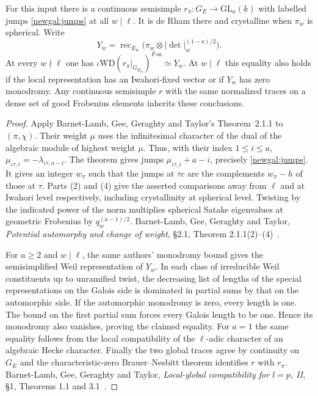 \begin{proposition}
For this input\label{newgal:classical} there is a continuous semisimple $r_\pi:G_E\to
\mathrm{GL}_a(k)$ with labelled jumps \eqref{newgal:jumps} at all
$w\mid\ell$. It is de Rham there and crystalline when $\pi_w$ is
spherical. Write
\[
 Y_w=\operatorname{rec}_{E_w}\bigl(\pi_w\otimes|\det|_w^{(1-a)/2}\bigr).
\]
At every $w\nmid\ell$ one has $\iota\mathrm{WD}(r_\pi|_{G_{E_w}})^{F\text{-}\mathrm{ss}}
\simeq Y_w$. At $w\mid\ell$ this equality also holds if the local
representation has an Iwahori-fixed vector or if $Y_w$ has zero monodromy.
Any continuous semisimple $r$ with the same normalized traces on a dense
set of good Frobenius elements inherits these conclusions.
\end{proposition}
\begin{proof}
Apply Barnet-Lamb, Gee, Geraghty and Taylor's Theorem~2.1.1 to $(\pi,\chi)$.
Their weight $\mu$ uses the infinitesimal character of the dual of the
algebraic module of highest weight $\mu$. Thus, with their index $1\le i\le a$,
$\mu_{\iota\tau,i}=-\lambda_{\iota\tau,a-i}$. The theorem gives jumps
$\mu_{\iota\tau,i}+a-i$, precisely \eqref{newgal:jumps}. It gives an
integer $w_\pi$ such that the jumps at $\tau c$ are the complements
$w_\pi-h$ of those at $\tau$. Parts (2) and (4) give the asserted
comparisons away from $\ell$ and at Iwahori level respectively, including
crystallinity at spherical level. Twisting by the indicated power of the
norm multiplies spherical Satake eigenvalues at geometric Frobenius by
$q_w^{(a-1)/2}$.
Barnet-Lamb,
Gee, Geraghty and Taylor, \emph{Potential automorphy and change of weight},
\S2.1, Theorem 2.1.1(2)--(4)~\cite{blggtPotential}.

For $a\ge2$ and $w\mid\ell$, the same authors' monodromy bound gives
the semisimplified Weil representation of $Y_w$. In each class of
irreducible Weil constituents up to unramified twist, the decreasing
list of lengths of the special representations on the Galois side is
dominated in partial sums by that on the automorphic side. If the
automorphic monodromy is zero, every length is one. The bound on the
first partial sum forces every Galois length to be one. Hence its
monodromy also vanishes, proving the claimed equality. For $a=1$
the same equality follows from the local compatibility of the
$\ell$-adic character of an algebraic Hecke character. Finally the
two global traces agree by continuity on $G_E$ and the characteristic-zero
Brauer--Nesbitt theorem identifies $r$ with $r_\pi$.
Barnet-Lamb,
Gee, Geraghty and Taylor, \emph{Local-global compatibility for $l=p$, II},
\S1, Theorems 1.1 and 3.1~\cite{blggtLocal}.
\end{proof}

